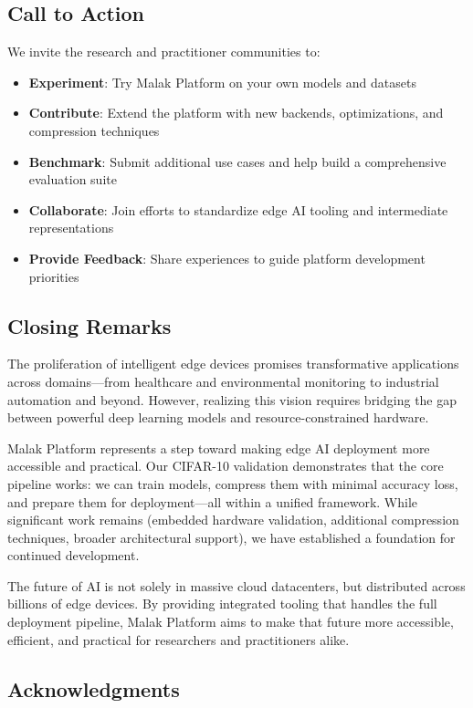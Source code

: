 \subsection{Call to Action}

We invite the research and practitioner communities to:
\begin{itemize}
\item \textbf{Experiment}: Try Malak Platform on your own models and datasets
\item \textbf{Contribute}: Extend the platform with new backends, optimizations, and compression techniques
\item \textbf{Benchmark}: Submit additional use cases and help build a comprehensive evaluation suite
\item \textbf{Collaborate}: Join efforts to standardize edge AI tooling and intermediate representations
\item \textbf{Provide Feedback}: Share experiences to guide platform development priorities
\end{itemize}

\subsection{Closing Remarks}

The proliferation of intelligent edge devices promises transformative applications across domains—from healthcare and environmental monitoring to industrial automation and beyond. However, realizing this vision requires bridging the gap between powerful deep learning models and resource-constrained hardware.

Malak Platform represents a step toward making edge AI deployment more accessible and practical. Our CIFAR-10 validation demonstrates that the core pipeline works: we can train models, compress them with minimal accuracy loss, and prepare them for deployment—all within a unified framework. While significant work remains (embedded hardware validation, additional compression techniques, broader architectural support), we have established a foundation for continued development.

The future of AI is not solely in massive cloud datacenters, but distributed across billions of edge devices. By providing integrated tooling that handles the full deployment pipeline, Malak Platform aims to make that future more accessible, efficient, and practical for researchers and practitioners alike.

\subsection*{Acknowledgments}

